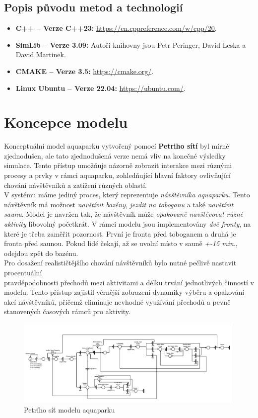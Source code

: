 \documentclass[a4paper, 11pt]{article}
\begin{document}
    \subsection{Popis původu metod a technologií}
    \begin{itemize}
        \item \textbf{C++ – Verze C++23:} \url{https://en.cppreference.com/w/cpp/20}.
        \item \textbf{SimLib – Verze 3.09:} Autoři knihovny jsou Petr Peringer, David Leska a David Martinek.
        \item \textbf{CMAKE – Verze 3.5:} \url{https://cmake.org/}.
        \item \textbf{Linux Ubuntu – Verze 22.04:} \url{https://ubuntu.com/}.
    \end{itemize}
    \newpage
    \section{Koncepce modelu}
    Konceptuální model aquaparku vytvořený pomocí\textbf{ Petriho sítí} byl mírně zjednodušen, ale tato zjednodušená verze nemá vliv na konečné výsledky simulace. Tento přístup umožňuje názorně zobrazit interakce mezi různými procesy a prvky v rámci aquaparku, zohledňující hlavní faktory ovlivňující chování návštěvníků a zatížení různých oblastí. \\
    V systému máme jediný proces, který reprezentuje \textit{návštěvníka aquaparku}. Tento návštěvník má možnost \textit{navštívit bazény}, \textit{jezdit na toboganu} a také \textit{navštívit saunu}. Model je navržen tak, že návštěvník může \textit{opakovaně navštěvovat různé aktivity} libovolný početkrát. V rámci modelu jsou implementovány \textit{dvě fronty}, na které je třeba zaměřit pozornost. První je fronta před toboganem a druhá je fronta před saunou. Pokud lidé čekají, až se uvolní místo v sauně \textit{+-15 min}., odejdou zpět do bazénu. \\
    Pro dosažení realističtějšího chování návštěvníků bylo nutné pečlivě nastavit procentuální \\ pravděpodobnosti přechodů mezi aktivitami a délku trvání jednotlivých činností v modelu. Tento přístup zajistil věrnější zobrazení dynamiky výběru a opakování akcí návštěvníků, přičemž eliminuje nevhodné využívání přechodů a pevně stanovených časových rámců pro aktivity.
    

    \begin{figure}[h]
    \centering
    \includegraphics[width=\textwidth, keepaspectratio]{ims.pdf}
    \caption{Petrího síť modelu aquaparku}
    \label{fig:pdf_image}
    \end{figure}
    
\end{document}

